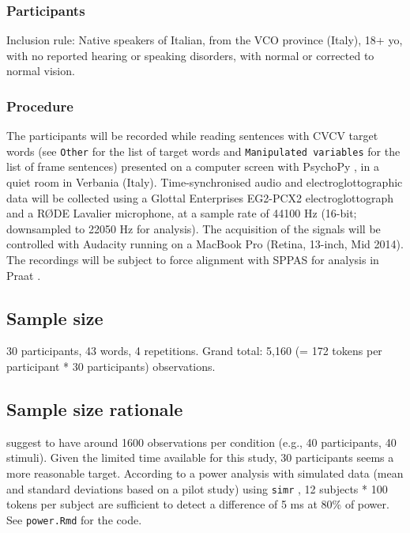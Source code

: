 \documentclass[11pt,]{article}
\begin{document}
\hypertarget{participants}{%
\subsubsection{Participants}\label{participants}}

Inclusion rule: Native speakers of Italian, from the VCO province
(Italy), 18+ yo, with no reported hearing or speaking disorders, with
normal or corrected to normal vision.

\hypertarget{procedure}{%
\subsubsection{Procedure}\label{procedure}}

The participants will be recorded while reading sentences with CVCV
target words (see \texttt{Other} for the list of target words and
\texttt{Manipulated\ variables} for the list of frame sentences)
presented on a computer screen with PsychoPy \citep{peirce2009}, in a
quiet room in Verbania (Italy). Time-synchronised audio and
electroglottographic data will be collected using a Glottal Enterprises
EG2-PCX2 electroglottograph and a RØDE Lavalier microphone, at a sample
rate of 44100 Hz (16-bit; downsampled to 22050 Hz for analysis). The
acquisition of the signals will be controlled with Audacity running on a
MacBook Pro (Retina, 13-inch, Mid 2014). The recordings will be subject
to force alignment with SPPAS \citep{bigi2015} for analysis in Praat
\citep{boersma2018}.

\hypertarget{sample-size}{%
\subsection{Sample size}\label{sample-size}}

30 participants, 43 words, 4 repetitions. Grand total: 5,160 (= 172
tokens per participant * 30 participants) observations.

\hypertarget{sample-size-rationale}{%
\subsection{Sample size rationale}\label{sample-size-rationale}}

\citet{brysbaert2018} suggest to have around 1600 observations per
condition (e.g., 40 participants, 40 stimuli). Given the limited time
available for this study, 30 participants seems a more reasonable
target. According to a power analysis with simulated data (mean and
standard deviations based on a pilot study) using \texttt{simr}
\citep{green2016}, 12 subjects * 100 tokens per subject are sufficient
to detect a difference of 5 ms at 80\% of power. See \texttt{power.Rmd}
for the code.
\end{document}
